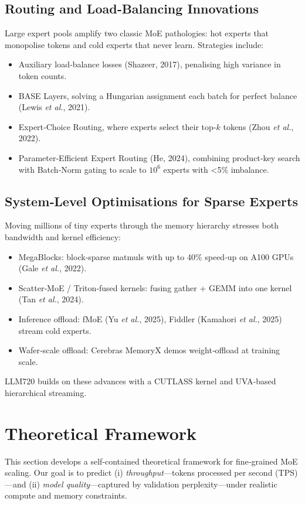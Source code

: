 \documentclass[11pt]{article}
\begin{document}
\subsection{Routing and Load‑Balancing Innovations}
Large expert pools amplify two classic MoE pathologies: hot experts that monopolise tokens
and cold experts that never learn. Strategies include:
\begin{itemize}
  \item Auxiliary load‑balance losses (Shazeer, 2017), penalising high variance in token counts.
  \item BASE Layers, solving a Hungarian assignment each batch for perfect balance (Lewis \emph{et al.}, 2021).
  \item Expert‑Choice Routing, where experts select their top‑$k$ tokens (Zhou \emph{et al.}, 2022).
  \item Parameter‑Efficient Expert Routing (He, 2024), combining product‑key search with Batch‑Norm gating to scale to $10^6$ experts with <5\% imbalance.
\end{itemize}

\subsection{System‑Level Optimisations for Sparse Experts}
Moving millions of tiny experts through the memory hierarchy stresses both bandwidth and
kernel efficiency:
\begin{itemize}
  \item MegaBlocks: block‑sparse matmuls with up to 40\% speed‑up on A100 GPUs (Gale \emph{et al.}, 2022).
  \item Scatter‑MoE / Triton‑fused kernels: fusing gather + GEMM into one kernel (Tan \emph{et al.}, 2024).
  \item Inference offload: fMoE (Yu \emph{et al.}, 2025), Fiddler (Kamahori \emph{et al.}, 2025) stream cold experts.
  \item Wafer‑scale offload: Cerebras MemoryX demos weight‑offload at training scale.
\end{itemize}
LLM720 builds on these advances with a CUTLASS kernel and UVA‑based hierarchical streaming.

\section{Theoretical Framework}\label{sec:theory}
This section develops a self‑contained theoretical framework for fine‑grained MoE scaling.
Our goal is to predict (i) \emph{throughput}—tokens processed per second (TPS)—and (ii)
\emph{model quality}—captured by validation perplexity—under realistic compute and memory
constraints.
\end{document}
